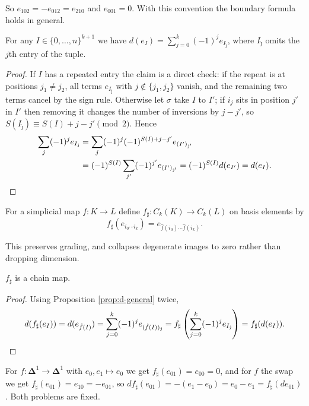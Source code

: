 \documentclass[a4paper]{scrartcl}
\newcommand{\bDelta}{\boldsymbol{\Delta}}
\begin{document}
So $e_{102} = -e_{012} = e_{210}$ and $e_{001} = 0$. With this convention the boundary
formula holds in general.

\begin{proposition} \label{prop:d-general}
	For any $I \in \{0,\dots,n\}^{k+1}$ we have $d(e_I) = \sum_{j=0}^k(-1)^je_{I_{\hat\jmath}}$, where $I_{\hat\jmath}$ omits the $j$th entry of the tuple.
\end{proposition}
\begin{proof}
	If $I$ has a repeated entry the claim is a direct check: if the repeat is at positions $j_1 \neq j_2$, all terms $e_{I_{\hat\jmath}}$ with $j \notin \{j_1,j_2\}$ vanish, and the remaining two terms cancel by the sign rule. Otherwise let $\sigma$ take $I$ to $I'$; if $i_j$ sits in position $j'$ in $I'$ then removing it changes the number of inversions by $j - j'$, so $S(I_{\hat\jmath}) \equiv S(I) + j - j' \pmod 2$. Hence
	\begin{align*}
	\sum_j (-1)^je_{I_{\hat\jmath}} &= \sum_j (-1)^{j}(-1)^{S(I)+j-j'}e_{(I')_{\hat\jmath'}} \\
	&= (-1)^{S(I)}\sum_{j'}(-1)^{j'}e_{(I')_{\hat\jmath'}} = (-1)^{S(I)}d(e_{I'}) = d(e_I). \qedhere
	\end{align*}
\end{proof}

\begin{definition}
	For a simplicial map $f: K \to L$ define $f_\sharp: C_k(K) \to C_k(L)$ on basis elements by
	$$
	f_\sharp(e_{i_0\cdots i_k}) = e_{\hat f(i_0)\cdots \hat f(i_k)} .
	$$
\end{definition}

This preserves grading, and collapses degenerate images to zero rather than dropping
dimension.

\begin{proposition}
	$f_\sharp$ is a chain map.
\end{proposition}
\begin{proof}
	Using Proposition \ref{prop:d-general} twice,
	$$
	d(f_\sharp(e_I)) = d(e_{\hat f(I)}) = \sum_{j=0}^k(-1)^je_{(\hat f(I))_{\hat\jmath}} = f_\sharp\left(\sum_{j=0}^k(-1)^je_{I_{\hat\jmath}}\right) = f_\sharp(d(e_I)). \qedhere
	$$
\end{proof}

\begin{example}
	For $f: \bDelta^1\to\bDelta^1$ with $e_0,e_1 \mapsto e_0$ we get $f_\sharp(e_{01}) = e_{00} = 0$, and for $f$ the swap we get $f_\sharp(e_{01}) = e_{10} = -e_{01}$, so $df_\sharp(e_{01}) = -(e_1-e_0) = e_0-e_1 = f_\sharp(d e_{01})$. Both problems are fixed.
\end{example}
\end{document}
